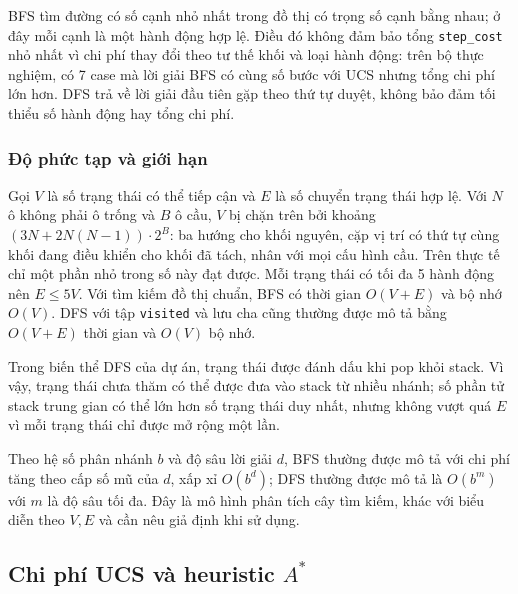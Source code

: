 BFS tìm đường có số cạnh nhỏ nhất trong đồ thị có trọng số cạnh bằng nhau; ở đây mỗi cạnh là một hành động hợp lệ. Điều đó không đảm bảo tổng \texttt{step\_cost} nhỏ nhất vì chi phí thay đổi theo tư thế khối và loại hành động: trên bộ thực nghiệm, có 7 case mà lời giải BFS có cùng số bước với UCS nhưng tổng chi phí lớn hơn. DFS trả về lời giải đầu tiên gặp theo thứ tự duyệt, không bảo đảm tối thiểu số hành động hay tổng chi phí.

\subsubsection{Độ phức tạp và giới hạn}
Gọi $V$ là số trạng thái có thể tiếp cận và $E$ là số chuyển trạng thái hợp lệ. Với $N$ ô không phải ô trống và $B$ ô cầu, $V$ bị chặn trên bởi khoảng $(3N + 2N(N-1))\cdot 2^{B}$: ba hướng cho khối nguyên, cặp vị trí có thứ tự cùng khối đang điều khiển cho khối đã tách, nhân với mọi cấu hình cầu. Trên thực tế chỉ một phần nhỏ trong số này đạt được. Mỗi trạng thái có tối đa 5 hành động nên $E\le 5V$. Với tìm kiếm đồ thị chuẩn, BFS có thời gian $O(V+E)$ và bộ nhớ $O(V)$. DFS với tập \texttt{visited} và lưu cha cũng thường được mô tả bằng $O(V+E)$ thời gian và $O(V)$ bộ nhớ.

Trong biến thể DFS của dự án, trạng thái được đánh dấu khi pop khỏi stack. Vì vậy, trạng thái chưa thăm có thể được đưa vào stack từ nhiều nhánh; số phần tử stack trung gian có thể lớn hơn số trạng thái duy nhất, nhưng không vượt quá $E$ vì mỗi trạng thái chỉ được mở rộng một lần.

Theo hệ số phân nhánh $b$ và độ sâu lời giải $d$, BFS thường được mô tả với chi phí tăng theo cấp số mũ của $d$, xấp xỉ $O(b^d)$; DFS thường được mô tả là $O(b^m)$ với $m$ là độ sâu tối đa. Đây là mô hình phân tích cây tìm kiếm, khác với biểu diễn theo $V,E$ và cần nêu giả định khi sử dụng.

\subsection{Chi phí UCS và heuristic $A^*$}


